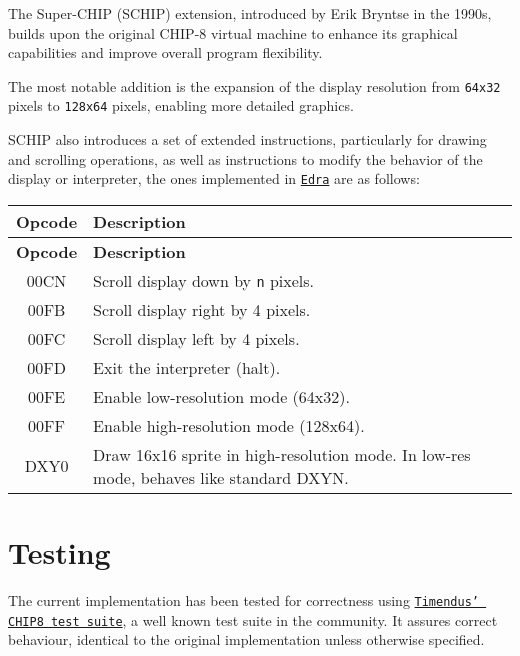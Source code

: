 \par The Super-CHIP (SCHIP) extension, introduced by Erik Bryntse in the 1990s, builds upon the original CHIP-8 virtual machine to enhance its graphical capabilities and improve overall program flexibility.

\par The most notable addition is the expansion of the display resolution from \texttt{64x32} pixels to \texttt{128x64} pixels, enabling more detailed graphics.

\par SCHIP also introduces a set of extended instructions\cite{CHIP8Gulrak}, particularly for drawing and scrolling operations, as well as instructions to modify the behavior of the display or interpreter, the ones implemented in \href{https://github.com/solomonarul/edra}{\texttt{Edra}} are as follows:

\begin{longtable}{|c|p{10cm}|}
\hline
\textbf{Opcode} & \textbf{Description} \\
\hline
\endfirsthead

\hline
\textbf{Opcode} & \textbf{Description} \\
\hline
\endhead

\hline
\endfoot

\hline
\endlastfoot

00CN & Scroll display down by \texttt{n} pixels. \\
00FB & Scroll display right by 4 pixels. \\
00FC & Scroll display left by 4 pixels. \\
00FD & Exit the interpreter (halt). \\
00FE & Enable low-resolution mode (64x32). \\
00FF & Enable high-resolution mode (128x64). \\
DXY0 & Draw 16x16 sprite in high-resolution mode. In low-res mode, behaves like standard DXYN. \\
\end{longtable}

\section{Testing}
\label{sec:ch3sec5}

\par The current implementation has been tested for correctness using \href{https://github.com/Timendus/chip8-test-suite}{\texttt{Timendus' CHIP8 test suite}}, a well known test suite in the community. It assures correct behaviour, identical to the original implementation unless otherwise specified. 


